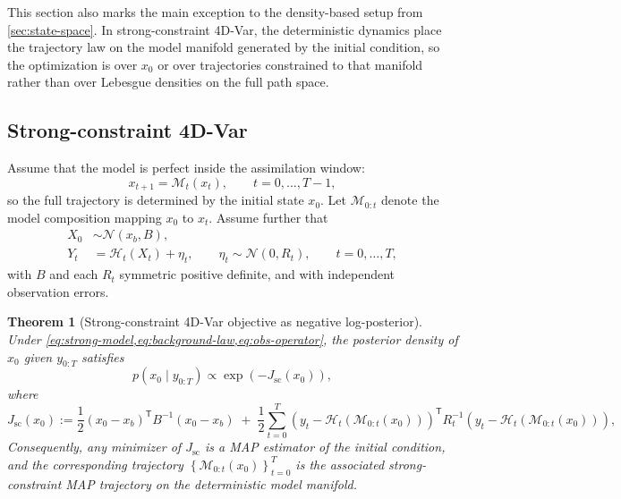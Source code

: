 \documentclass[11pt]{article}
\newcommand{\ytraj}{y_{0:T}}
\newcommand{\set}[1]{\left\{ #1 \right\}}
\newcommand{\parens}[1]{\left( #1 \right)}
\newcommand{\transpose}{^{\mathsf T}}
\numberwithin{equation}{section}
\theoremstyle{plain}
\newtheorem{theorem}{Theorem}[section]
\theoremstyle{definition}
\theoremstyle{remark}
\begin{document}
This section also marks the main exception to the density-based setup from \cref{sec:state-space}. In strong-constraint 4D-Var, the deterministic dynamics place the trajectory law on the model manifold generated by the initial condition, so the optimization is over $x_0$ or over trajectories constrained to that manifold rather than over Lebesgue densities on the full path space.

\subsection{Strong-constraint 4D-Var}

Assume that the model is perfect inside the assimilation window:
\begin{equation}
x_{t+1} = \mathcal M_t(x_t), \qquad t=0,\dots,T-1,
\label{eq:strong-model}
\end{equation}
so the full trajectory is determined by the initial state $x_0$. Let $\mathcal M_{0:t}$ denote the model composition mapping $x_0$ to $x_t$. Assume further that
\begin{align}
X_0 &\sim \mathcal N(x_b,B), \label{eq:background-law}\\
Y_t &= \mathcal H_t(X_t) + \eta_t, \qquad \eta_t\sim \mathcal N(0,R_t), \qquad t=0,\dots,T,
\label{eq:obs-operator}
\end{align}
with $B$ and each $R_t$ symmetric positive definite, and with independent observation errors.

\begin{theorem}[Strong-constraint 4D-Var objective as negative log-posterior]
\label{thm:strong-4dvar}
Under \cref{eq:strong-model,eq:background-law,eq:obs-operator}, the posterior density of $x_0$ given $\ytraj$ satisfies
\begin{equation}
p(x_0\mid \ytraj)
\propto
\exp\parens{-J_{\mathrm{sc}}(x_0)},
\end{equation}
where
\begin{equation}
J_{\mathrm{sc}}(x_0)
:=
\frac12 (x_0-x_b)\transpose B^{-1}(x_0-x_b)
\;+\;
\frac12\sum_{t=0}^{T}
\parens{y_t-\mathcal H_t(\mathcal M_{0:t}(x_0))}\transpose
R_t^{-1}
\parens{y_t-\mathcal H_t(\mathcal M_{0:t}(x_0))},
\label{eq:strong-4dvar-cost}
\end{equation}
Consequently, any minimizer of $J_{\mathrm{sc}}$ is a MAP estimator of the initial condition, and the corresponding trajectory $\set{\mathcal M_{0:t}(x_0)}_{t=0}^{T}$ is the associated strong-constraint MAP trajectory on the deterministic model manifold.
\end{theorem}
\end{document}
